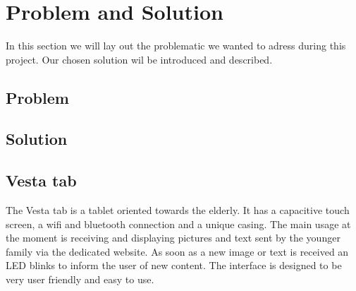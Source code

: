 \section{Problem and Solution}
In this section we will lay out the problematic we wanted to adress during this project. Our chosen solution wil be introduced and described.
\subsection{Problem}
\subsection{Solution}
\subsection{Vesta tab}
The Vesta tab is a tablet oriented towards the elderly. It has a capacitive touch screen, a wifi and bluetooth connection and a unique casing. The main usage at the moment is receiving and displaying pictures and text sent by the younger family via the dedicated website. As soon as a new image or text is received an LED blinks to inform the user of new content. The interface is designed to be very user friendly and easy to use.